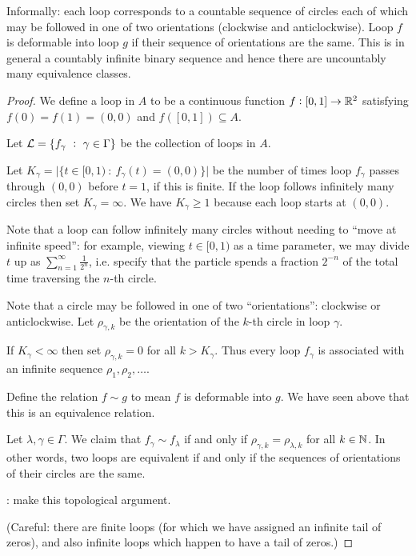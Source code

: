 \begin{enumerate}[label=(\alph*)]
  Informally: each loop corresponds to a countable sequence of circles each of which may be followed in one of
  two orientations (clockwise and anticlockwise). Loop $f$ is deformable into loop $g$ if their sequence of
  orientations are the same. This is in general a countably infinite binary sequence and hence there are
  uncountably many equivalence classes.

  \begin{proof}
    We define a loop in $A$ to be a continuous function $f: [0, 1] \to \mathbb{R}^2$ satisfying $f(0) = f(1) = (0, 0)$
    and $f([0, 1]) \subseteq A$.

    Let $\mathcal L = \{f_\gamma ~:~ \gamma \in \Gamma\}$ be the collection of loops in $A$.

    Let $K_\gamma = \big|\{t \in [0, 1) ~:~ f_\gamma(t) = (0, 0) \}\big|$ be the number of times
    loop $f_\gamma$ passes through $(0, 0)$ before $t = 1$, if this is finite. If the loop follows infinitely
    many circles then set $K_\gamma = \infty$. We have $K_\gamma \geq 1$ because each loop starts
    at $(0, 0)$.

    Note that a loop can follow infinitely many circles without needing to ``move at infinite
    speed'': for example, viewing $t \in [0, 1)$ as a time parameter, we may divide $t$ up
    as $\sum_{n=1}^\infty \frac{1}{2^n}$, i.e. specify that the particle spends a fraction $2^{-n}$
    of the total time traversing the $n$-th circle.

    Note that a circle may be followed in one of two ``orientations​'': clockwise or anticlockwise.
    Let $\rho_{\gamma, k}$ be the orientation of the $k$-th circle in loop $\gamma$.

    If $K_\gamma < \infty$ then set $\rho_{\gamma, k} = 0$ for all $k > K_\gamma$. Thus every loop $f_\gamma$
    is associated with an infinite sequence $\rho_1, \rho_2, \ldots$.

    Define the relation $f \sim g$ to mean $f$ is deformable into $g$. We have seen above that this is an
    equivalence relation.

    Let $\lambda, \gamma \in \Gamma$. We claim that $f_\gamma \sim f_\lambda$ if and only
    if $\rho_{\gamma, k} = \rho_{\lambda, k}$ for all $k \in \mathbb{N}$. In other words, two loops are equivalent if
    and only if the sequences of orientations of their circles are the same.

    : make this topological argument.

    (Careful: there are finite loops (for which we have assigned an infinite tail of zeros), and also infinite
    loops which happen to have a tail of zeros.)


\end{proof}
\end{enumerate}
